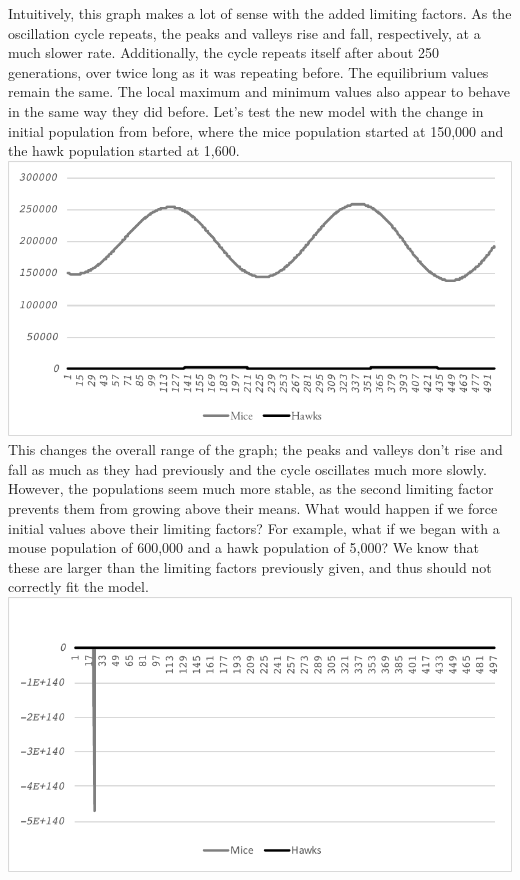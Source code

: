 \documentclass[10pt,letterpaper]{article}
\begin{document}
			\newline \newline
			Intuitively, this graph makes a lot of sense with the added limiting factors. As the oscillation cycle repeats, the peaks and valleys rise and fall, respectively, at a much slower rate. Additionally, the cycle repeats itself after about 250 generations, over twice long as it was repeating before. The equilibrium values remain the same. The local maximum and minimum values also appear to behave in the same way they did before. 
			\newline \newline
			Let's test the new model with the change in initial population from before, where the mice population started at 150,000 and the hawk population started at 1,600.
			\newline \newline 
			\includegraphics[width=\textwidth]{graph5.pdf}
			\newline \newline
			This changes the overall range of the graph; the peaks and valleys don't rise and fall as much as they had previously and the cycle oscillates much more slowly. However, the populations seem much more stable, as the second limiting factor prevents them from growing above their means. 
			\newline \newline
			What would happen if we force initial values above their limiting factors? For example, what if we began with a mouse population of 600,000 and a hawk population of 5,000? We know that these are larger than the limiting factors previously given, and thus should not correctly fit the model.
			\newline \newline 
			\includegraphics[width=\textwidth]{graph6.pdf}
\end{document}
